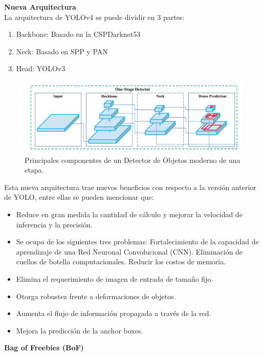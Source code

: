 \textbf{Nueva Arquitectura} \\

La arquitectura de YOLOv4 se puede dividir en 3 partes:
\begin{enumerate}
    \item {Backbone: Basado en la CSPDarknet53}
    \item {Neck: Basado en SPP y PAN}
    \item {Head: YOLOv3}
\end{enumerate}

\begin{figure}
    \centering
    \includegraphics[width=1\textwidth]{img/ObjectDetectionArqui.png}
    \caption{Principales componentes de un Detector de Objetos moderno de una etapa.}
    \label{fig:object-detection-arqui}
\end{figure}

Esta nueva arquitectura trae nuevos beneficios con respecto a la versión anterior de YOLO, entre ellas se pueden mencionar que: 
\begin{itemize}
    \item Reduce en gran medida la cantidad de cálculo y mejorar la velocidad de inferencia y la precisión.
    \item Se ocupa de los siguientes tres problemas: Fortalecimiento de la capacidad de aprendizaje de una Red Neuronal Convolucional (CNN).
    Eliminación de cuellos de botella computacionales.
    Reducir los costos de memoria.
    \item Elimina el requerimiento de imagen de entrada de tamaño fijo.
    \item Otorga robustez frente a deformaciones de objetos.
    \item Aumenta el flujo de información propagada a través de la red.
    \item Mejora la predicción de la anchor boxes.
\end{itemize}
\hfill \break

\textbf{Bag of Freebies (BoF)} \\

